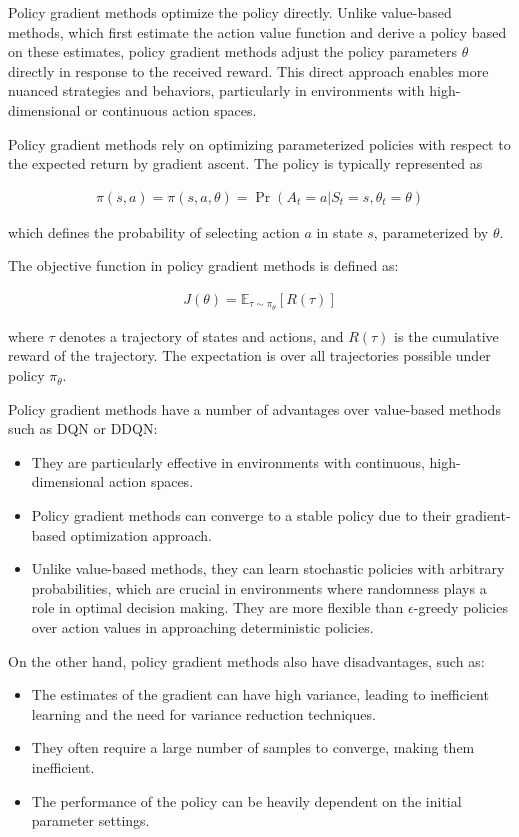 Policy gradient methods optimize the policy directly. Unlike value-based methods, which first estimate the action value function and derive a policy based on these estimates, policy gradient methods adjust the policy parameters $\theta$ directly in response to the received reward. This direct approach enables more nuanced strategies and behaviors, particularly in environments with high-dimensional or continuous action spaces.

Policy gradient methods rely on optimizing parameterized policies with respect to the expected return by gradient ascent. The policy is typically represented as 

\begin{align*}
\pi(s, a) = \pi(s, a, \theta) = \Pr(A_t = a | S_t = s, \theta_t = \theta)
\end{align*}

which defines the probability of selecting action $a$ in state $s$, parameterized by $\theta$. 

The objective function in policy gradient methods is defined as:

\begin{align*}
J(\theta) = \mathbb{E}_{\tau \sim \pi_\theta} \left[ R(\tau) \right]
\end{align*}

where $\tau$ denotes a trajectory of states and actions, and $R(\tau)$ is the cumulative reward of the trajectory. The expectation is over all trajectories possible under policy $\pi_\theta$.

Policy gradient methods have a number of advantages over value-based methods such as DQN or DDQN:
\begin{itemize}
\item They are particularly effective in environments with continuous, high-dimensional action spaces.
\item Policy gradient methods can converge to a stable policy due to their gradient-based optimization approach.
\item Unlike value-based methods, they can learn stochastic policies with arbitrary probabilities, which are crucial in environments where randomness plays a role in optimal decision making. They are more flexible than $\epsilon$-greedy policies over action values in approaching deterministic policies.
\end{itemize}

On the other hand, policy gradient methods also have disadvantages, such as:
\begin{itemize}
\item The estimates of the gradient can have high variance, leading to inefficient learning and the need for variance reduction techniques.
\item They often require a large number of samples to converge, making them inefficient.
\item The performance of the policy can be heavily dependent on the initial parameter settings.
\end{itemize}

